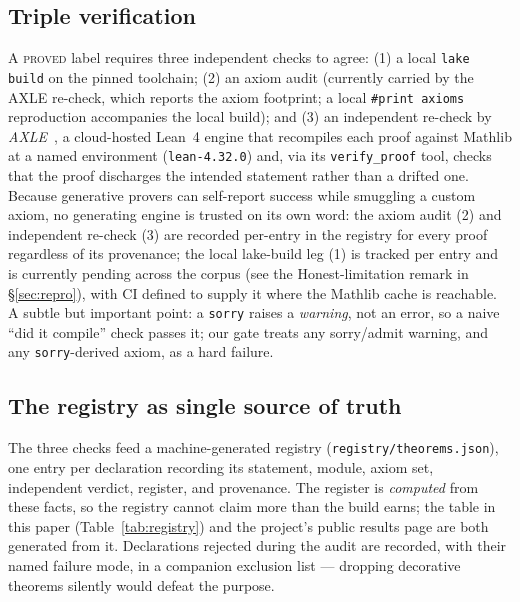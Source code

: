 \documentclass[11pt]{article}
\theoremstyle{definition}
\theoremstyle{remark}
\newcommand{\lean}[1]{\texttt{#1}}
\begin{document}
\subsection{Triple verification}\label{sec:triple}
A \textsc{proved} label requires three independent checks to agree:
(1) a local \lean{lake build} on the pinned toolchain; (2) an axiom audit (currently
carried by the AXLE re-check, which reports the axiom footprint; a local
\lean{\#print axioms} reproduction accompanies the local build); and (3) an independent
re-check by \emph{AXLE}~\cite{axle}, a
cloud-hosted Lean~4 engine that recompiles each proof against Mathlib at a named environment
(\lean{lean-4.32.0}) and, via its \lean{verify\_proof} tool, checks that the proof discharges
the intended statement rather than a drifted one. Because generative provers can self-report
success while smuggling a custom axiom, no generating engine is trusted on its own word: the
axiom audit (2) and independent re-check (3) are recorded per-entry in the registry for every
proof regardless of its provenance; the local lake-build leg (1) is tracked per entry and is
currently pending across the corpus (see the Honest-limitation remark in \S\ref{sec:repro}),
with CI defined to supply it where the Mathlib cache is reachable. A subtle but important point: a \lean{sorry}
raises a \emph{warning}, not an error, so a naive ``did it compile'' check passes it; our gate
treats any sorry/admit warning, and any \lean{sorry}-derived axiom, as a hard failure.

\subsection{The registry as single source of truth}
The three checks feed a machine-generated registry (\lean{registry/theorems.json}), one entry
per declaration recording its statement, module, axiom set, independent verdict, register, and
provenance. The register is \emph{computed} from these facts, so the registry cannot claim more
than the build earns; the table in this paper (Table~\ref{tab:registry}) and the project's
public results page are both generated from it. Declarations rejected during the audit are
recorded, with their named failure mode, in a companion exclusion list --- dropping decorative
theorems silently would defeat the purpose.
\end{document}
